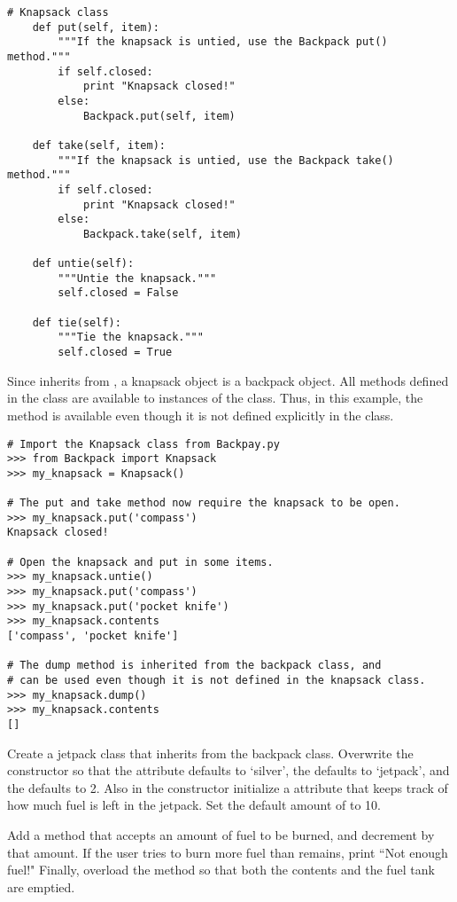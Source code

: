 \begin{lstlisting}
# Knapsack class
    def put(self, item):
        """If the knapsack is untied, use the Backpack put() method."""
        if self.closed:
            print "Knapsack closed!"
        else:
            Backpack.put(self, item)
    
    def take(self, item):
        """If the knapsack is untied, use the Backpack take() method."""
        if self.closed:
            print "Knapsack closed!"
        else:
            Backpack.take(self, item)
    
    def untie(self):
        """Untie the knapsack."""
        self.closed = False
    
    def tie(self):
        """Tie the knapsack."""
        self.closed = True
\end{lstlisting}

Since  inherits from , a knapsack object is a backpack object.
All methods defined in the  class are available to instances of the  class.
Thus, in this example, the  method is available even though it is not defined explicitly in the  class.

\begin{lstlisting}
# Import the Knapsack class from Backpay.py
>>> from Backpack import Knapsack
>>> my_knapsack = Knapsack()

# The put and take method now require the knapsack to be open.
>>> my_knapsack.put('compass')
Knapsack closed!

# Open the knapsack and put in some items.
>>> my_knapsack.untie()
>>> my_knapsack.put('compass')
>>> my_knapsack.put('pocket knife')
>>> my_knapsack.contents
['compass', 'pocket knife']

# The dump method is inherited from the backpack class, and
# can be used even though it is not defined in the knapsack class.
>>> my_knapsack.dump()
>>> my_knapsack.contents
[]
\end{lstlisting}

\begin{problem}
Create a jetpack class that inherits from the backpack class.
Overwrite the constructor so that the  attribute defaults to `silver', the  defaults to `jetpack', and the  defaults to 2.
Also in the constructor initialize a  attribute that keeps track of how much fuel is left in the jetpack.
Set the default amount of  to 10.

Add a  method that accepts an amount of fuel to be burned, and decrement  by that amount.
If the user tries to burn more fuel than remains, print ``Not enough fuel!"
Finally, overload the  method so that both the contents and the fuel tank are emptied.
\end{problem}

